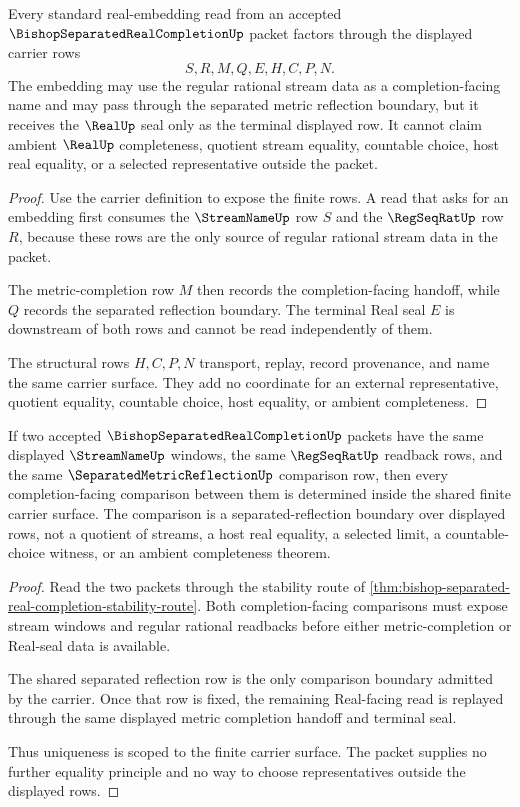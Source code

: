 \begin{theorem}
\label{thm:bishop-separated-real-completion-embedding-handoff}
Every standard real-embedding read from an accepted $\BishopSeparatedRealCompletionUp$ packet factors through the displayed carrier rows
$$
S,R,M,Q,E,H,C,P,N .
$$
The embedding may use the regular rational stream data as a completion-facing name and may pass through the separated metric reflection boundary, but it receives the $\RealUp$ seal only as the terminal displayed row. It cannot claim ambient $\RealUp$ completeness, quotient stream equality, countable choice, host real equality, or a selected representative outside the packet.
\end{theorem}
\begin{proof}
Use the carrier definition to expose the finite rows. A read that asks for an embedding first consumes the $\StreamNameUp$ row $S$ and the $\RegSeqRatUp$ row $R$, because these rows are the only source of regular rational stream data in the packet.

The metric-completion row $M$ then records the completion-facing handoff, while $Q$ records the separated reflection boundary. The terminal Real seal $E$ is downstream of both rows and cannot be read independently of them.

The structural rows $H,C,P,N$ transport, replay, record provenance, and name the same carrier surface. They add no coordinate for an external representative, quotient equality, countable choice, host equality, or ambient completeness.
\end{proof}

\begin{theorem}
\label{thm:bishop-separated-real-completion-uniqueness-boundary}
If two accepted $\BishopSeparatedRealCompletionUp$ packets have the same displayed $\StreamNameUp$ windows, the same $\RegSeqRatUp$ readback rows, and the same $\SeparatedMetricReflectionUp$ comparison row, then every completion-facing comparison between them is determined inside the shared finite carrier surface. The comparison is a separated-reflection boundary over displayed rows, not a quotient of streams, a host real equality, a selected limit, a countable-choice witness, or an ambient completeness theorem.
\end{theorem}
\begin{proof}
Read the two packets through the stability route of \autoref{thm:bishop-separated-real-completion-stability-route}. Both completion-facing comparisons must expose stream windows and regular rational readbacks before either metric-completion or Real-seal data is available.

The shared separated reflection row is the only comparison boundary admitted by the carrier. Once that row is fixed, the remaining Real-facing read is replayed through the same displayed metric completion handoff and terminal seal.

Thus uniqueness is scoped to the finite carrier surface. The packet supplies no further equality principle and no way to choose representatives outside the displayed rows.
\end{proof}

